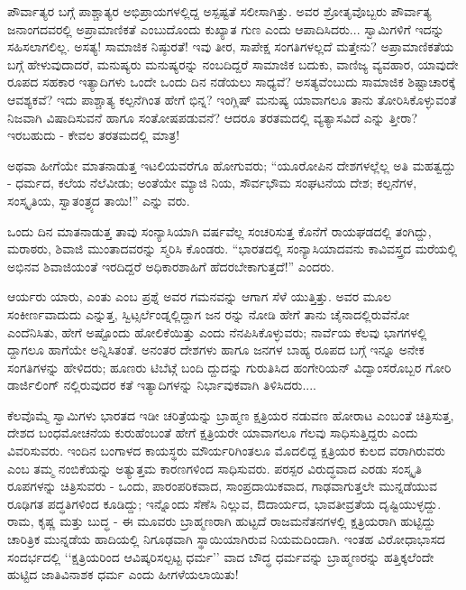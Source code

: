 ಪೌರ್ವಾತ್ಯರ ಬಗ್ಗೆ ಪಾಶ್ಚಾತ್ಯರ ಅಭಿಪ್ರಾಯಗಳಲ್ಲಿದ್ದ ಅಸ್ಪಷ್ಟತೆ ಸಲೀಸಾಗಿತ್ತು. ಅವರ ಶ್ರೋತೃವೊಬ್ಬರು ಪೌರ್ವಾತ್ಯ ಜನಾಂಗದವರಲ್ಲಿ ಅಪ್ರಾಮಾಣಿಕತೆ ಎಂಬುದೊಂದು ಕುಖ್ಯಾತ ಗುಣ ಎಂದು ಆಪಾದಿಸಿದರು... ಸ್ವಾಮಿಗಳಿಗೆ ಇದನ್ನು ಸಹಿಸಲಾಗಲಿಲ್ಲ. ಅಸತ್ಯ! ಸಾಮಾಜಿಕ ನಿಷ್ಠುರತೆ! ಇವು ತೀರ, ಸಾಪೇಕ್ಷ ಸಂಗತಿಗಳಲ್ಲದೆ ಮತ್ತೇನು? ಅಪ್ರಾಮಾಣಿಕತೆಯ ಬಗ್ಗೆ ಹೇಳುವುದಾದರೆ, ಮನುಷ್ಯರು ಮನುಷ್ಯರನ್ನು ನಂಬದಿದ್ದರೆ ಸಾಮಾಜಿಕ ಬದುಕು, ವಾಣಿಜ್ಯ ವ್ಯವಹಾರ, ಯಾವುದೇ ರೂಪದ ಸಹಕಾರ ಇತ್ಯಾದಿಗಳು ಒಂದೇ ಒಂದು ದಿನ ನಡೆಯಲು ಸಾಧ್ಯವೆ? ಅಸತ್ಯವೆಂಬುದು ಸಾಮಾಜಿಕ ಶಿಷ್ಟಾಚಾರಕ್ಕೆ ಆವಶ್ಯಕವೆ? ಇದು ಪಾಶ್ಚಾತ್ಯ ಕಲ್ಪನೆಗಿಂತ ಹೇಗೆ ಭಿನ್ನ? ಇಂಗ್ಲಿಷ್ ಮನುಷ್ಯ ಯಾವಾಗಲೂ ತಾನು ತೋರಿಸಿಕೊಳ್ಳುವಂತೆ ನಿಜವಾಗಿ ವಿಷಾದಿಸುವನೆ ಹಾಗೂ ಸಂತೋಷಪಡುವನೆ? ಆದರೂ ತರತಮದಲ್ಲಿ ವ್ಯತ್ಯಾಸವಿದೆ ಎನ್ನು ತ್ತೀರಾ? ಇರಬಹುದು - ಕೇವಲ ತರತಮದಲ್ಲಿ ಮಾತ್ರ!

ಅಥವಾ ಹೀಗೆಯೇ ಮಾತನಾಡುತ್ತ ಇಟಲಿಯವರೆಗೂ ಹೋಗುವರು; “ಯೂರೋಪಿನ ದೇಶಗಳಲ್ಲೆಲ್ಲ ಅತಿ ಮಹತ್ವದ್ದು - ಧರ್ಮದ, ಕಲೆಯ ನೆಲೆವೀಡು; ಅಂತೆಯೇ ಮ್ಯಾಜಿ ನಿಯ, ಸೌರ್ವಭೌಮ ಸಂಘಟನೆಯ ದೇಶ; ಕಲ್ಪನೆಗಳ, ಸಂಸ್ಕೃತಿಯ, ಸ್ವಾತಂತ್ರ್ಯದ ತಾಯಿ!” ಎನ್ನು ವರು.

ಒಂದು ದಿನ ಮಾತನಾಡುತ್ತ ತಾವು ಸಂನ್ಯಾಸಿಯಾಗಿ ವರ್ಷವೆಲ್ಲ ಸಂಚರಿಸುತ್ತ ಕೊನೆಗೆ ರಾಯಘಡದಲ್ಲಿ ತಂಗಿದ್ದು, ಮರಾಠರು, ಶಿವಾಜಿ ಮುಂತಾದವರನ್ನು ಸ್ಮರಿಸಿ ಕೊಂಡರು. “ಭಾರತದಲ್ಲಿ ಸಂನ್ಯಾಸಿಯಾದವನು ಕಾವಿವಸ್ತ್ರದ ಮರೆಯಲ್ಲಿ ಅಭಿನವ ಶಿವಾಜಿಯಂತೆ ಇರದಿದ್ದರೆ ಅಧಿಕಾರಶಾಹಿಗೆ ಹೆದರಬೇಕಾಗುತ್ತದೆ!” ಎಂದರು.

ಆರ್ಯರು ಯಾರು, ಎಂತು ಎಂಬ ಪ್ರಶ್ನೆ ಅವರ ಗಮನವನ್ನು ಆಗಾಗ ಸೆಳೆ ಯುತ್ತಿತ್ತು. ಅವರ ಮೂಲ ಸಂಕೀರ್ಣವಾದುದು ಎನ್ನುತ್ತ, ಸ್ವಿಟ್ಸರ್ಲೆಂಡ್ನಲ್ಲಿದ್ದಾಗ ಜನ ರನ್ನು ನೋಡಿ ಹೇಗೆ ತಾನು ಚೈನಾದಲ್ಲಿರುವೆನೋ ಎಂದೆನಿಸಿತು, ಹೇಗೆ ಅಷ್ಟೊಂದು ಹೋಲಿಕೆಯಿತ್ತು ಎಂದು ನೆನಪಿಸಿಕೊಳ್ಳುವರು; ನಾರ್ವೆಯ ಕೆಲವು ಭಾಗಗಳಲ್ಲಿ ದ್ದಾಗಲೂ ಹಾಗೆಯೇ ಅನ್ನಿಸಿತಂತೆ. ಅನಂತರ ದೇಶಗಳು ಹಾಗೂ ಜನಗಳ ಬಾಹ್ಯ ರೂಪದ ಬಗ್ಗೆ ಇನ್ನೂ ಅನೇಕ ಸಂಗತಿಗಳನ್ನು ಹೇಳಿದರು; ಹೂಣರು ಟಿಬೆಟ್ಗೆ ಬಂದಿ ದ್ದುದನ್ನು ಗುರುತಿಸಿದ ಹಂಗೇರಿಯನ್ ವಿದ್ವಾಂಸರೊಬ್ಬರ ಗೋರಿ ಡಾರ್ಜಿಲಿಂಗ್ ನಲ್ಲಿರುವುದರ ಕತೆ ಇತ್ಯಾದಿಗಳನ್ನು ನಿರ್ಭಾವುಕವಾಗಿ ತಿಳಿಸಿದರು....

 ಕೆಲವೊಮ್ಮೆ ಸ್ವಾಮಿಗಳು ಭಾರತದ ಇಡೀ ಚರಿತ್ರೆಯನ್ನು ಬ್ರಾಹ್ಮಣ ಕ್ಷತ್ರಿಯರ ನಡುವಣ ಹೋರಾಟ ಎಂಬಂತೆ ಚಿತ್ರಿಸುತ್ತ, ದೇಶದ ಬಂಧಮೋಚನೆಯ ಕುರುಹೆಂಬಂತೆ ಹೇಗೆ ಕ್ಷತ್ರಿಯರೇ ಯಾವಾಗಲೂ ಗೆಲವು ಸಾಧಿಸುತ್ತಿದ್ದರು ಎಂದು ವಿವರಿಸುವರು. ಇಂದಿನ ಬಂಗಾಳದ ಕಾಯಸ್ಥರು ಮೌರ್ಯರಿಗಿಂತಲೂ ಮೊದಲಿದ್ದ ಕ್ಷತ್ರಿಯರ ಕುಲದ ವರಾಗಿರುವರು ಎಂಬ ತಮ್ಮ ನಂಬಿಕೆಯನ್ನು ಅತ್ಯುತ್ತಮ ಕಾರಣಗಳಿಂದ ಸಾಧಿಸುವರು. ಪರಸ್ಪರ ವಿರುದ್ಧವಾದ ಎರಡು ಸಂಸ್ಕೃತಿ ರೂಪಗಳನ್ನು ಚಿತ್ರಿಸುವರು - ಒಂದು, ಪಾರಂಪರಿಕವಾದ, ಸಾಂಪ್ರದಾಯಿಕವಾದ, ಗಾಢವಾಗುತ್ತಲೇ ಮುನ್ನಡೆಯುವ ರೂಢಿಗತ ಪದ್ಧತಿಗಳಿಂದ ಕೂಡಿದ್ದು; ಇನ್ನೊಂದು ಸೆಣೆಸಿ ನಿಲ್ಲುವ, ಔದಾರ್ಯದ, ಭಾವತೀವ್ರತೆಯ ದೃಷ್ಟಿಯುಳ್ಳದ್ದು. ರಾಮ, ಕೃಷ್ಣ ಮತ್ತು ಬುದ್ಧ - ಈ ಮೂವರು ಬ್ರಾಹ್ಮಣರಾಗಿ ಹುಟ್ಟದೆ ರಾಜಮನೆತನಗಳಲ್ಲಿ ಕ್ಷತ್ರಿಯರಾಗಿ ಹುಟ್ಟಿದ್ದು ಚಾರಿತ್ರಿಕ ಮುನ್ನಡೆಯ ಹಾದಿಯಲ್ಲಿ ನಿಗೂಢವಾಗಿ ಸ್ಥಾಯಿಯಾಗಿರುವ ನಿಯಮದಿಂದಾಗಿ. ಇಂತಹ ವಿರೋಧಾಭಾಸದ ಸಂದರ್ಭದಲ್ಲಿ ‘‘ಕ್ಷತ್ರಿಯರಿಂದ ಆವಿಷ್ಕರಿಸಲ್ಪಟ್ಟ ಧರ್ಮ’’ ವಾದ ಬೌದ್ಧ ಧರ್ಮವನ್ನು ಬ್ರಾಹ್ಮಣರನ್ನು ಹತ್ತಿಕ್ಕಲೆಂದೇ ಹುಟ್ಟಿದ ಜಾತಿವಿನಾಶಕ ಧರ್ಮ ಎಂದು ಹೀಗಳೆಯಲಾಯಿತು!

